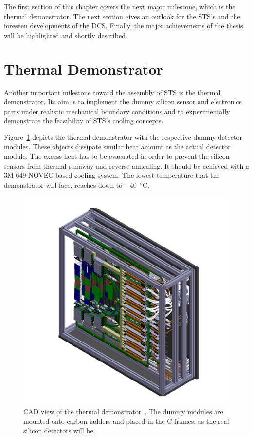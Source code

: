 The first section of this chapter covers the next major milestone, which is the thermal demonstrator. The next section gives an outlook for the \gls{STS}'s and the foreseen developments of the \gls{DCS}. Finally, the major achievements of the thesis will be highlighted and shortly described.

\section{Thermal Demonstrator}
Another important milestone toward the assembly of \gls{STS} is the thermal demonstrator. Its aim is to implement the dummy silicon sensor and electronics parts under realistic mechanical boundary conditions and to experimentally demonstrate the feasibility of \gls{STS}’s cooling concepts. 

Figure~\ref{fig:demo} depicts the thermal demonstrator with the respective dummy detector modules. These objects dissipate similar heat amount as the actual detector module. The excess heat has to be evacuated in order to prevent the silicon sensors from thermal runaway and reverse annealing. It should be achieved with a 3M 649 NOVEC based cooling system. The lowest temperature that the demonstrator will face, reaches down to \SI{-40}{\celsius}. 

\begin{figure}[!h]
    \centering
    \includegraphics[width=0.65\columnwidth]{Chapter7/images/thermal_demo.png}
    \caption{CAD view of the thermal demonstrator~\cite{thermal_demo}. The dummy modules are mounted onto carbon ladders and placed in the C-frames, as the real silicon detectors will be.}
    \label{fig:demo}
\end{figure}
\label{demo}


